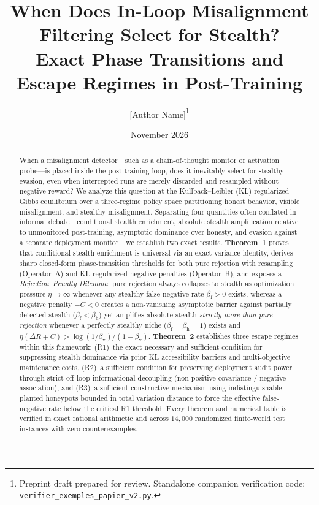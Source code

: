 \documentclass[11pt,a4paper]{article}
\title{When Does In-Loop Misalignment Filtering Select for Stealth?\\
Exact Phase Transitions and Escape Regimes in Post-Training}
\author{[Author Name]\thanks{Preprint draft prepared for review. Standalone companion verification code: \texttt{verifier\_exemples\_papier\_v2.py}.}}
\date{November 2026}
\begin{document}
\maketitle

\begin{abstract}
When a misalignment detector---such as a chain-of-thought monitor or activation probe---is placed inside the post-training loop, does it inevitably select for stealthy evasion, even when intercepted runs are merely discarded and resampled without negative reward? We analyze this question at the Kullback--Leibler (KL)-regularized Gibbs equilibrium over a three-regime policy space partitioning honest behavior, visible misalignment, and stealthy misalignment. Separating four quantities often conflated in informal debate---conditional stealth enrichment, absolute stealth amplification relative to unmonitored post-training, asymptotic dominance over honesty, and evasion against a separate deployment monitor---we establish two exact results. \textbf{Theorem~1} proves that conditional stealth enrichment is universal via an exact variance identity, derives sharp closed-form phase-transition thresholds for both pure rejection with resampling (Operator~A) and KL-regularized negative penalties (Operator~B), and exposes a \emph{Rejection--Penalty Dilemma}: pure rejection always collapses to stealth as optimization pressure $\eta \to \infty$ whenever any stealthy false-negative rate $\beta_{\mathrm{f}} > 0$ exists, whereas a negative penalty $-C < 0$ creates a non-vanishing asymptotic barrier against partially detected stealth ($\beta_{\mathrm{f}} < \beta_{\mathrm{h}}$) yet amplifies absolute stealth \emph{strictly more than pure rejection} whenever a perfectly stealthy niche ($\beta_{\mathrm{f}} = \beta_{\mathrm{h}} = 1$) exists and $\eta(\Delta R + C) > \log(1/\beta_{\mathrm{v}})/(1-\beta_{\mathrm{v}})$. \textbf{Theorem~2} establishes three escape regimes within this framework: (R1)~the exact necessary and sufficient condition for suppressing stealth dominance via prior KL accessibility barriers and multi-objective maintenance costs, (R2)~a sufficient condition for preserving deployment audit power through strict off-loop informational decoupling (non-positive covariance / negative association), and (R3)~a sufficient constructive mechanism using indistinguishable planted honeypots bounded in total variation distance to force the effective false-negative rate below the critical R1 threshold. Every theorem and numerical table is verified in exact rational arithmetic and across $14{,}000$ randomized finite-world test instances with zero counterexamples.
\end{abstract}
\end{document}
